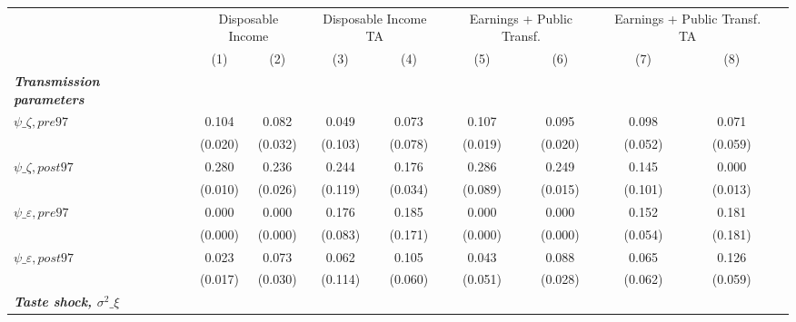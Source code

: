 \begin{tabular}{l*{10}{c}} \toprule
                    &            &\multicolumn{2}{c}{Disposable Income}&\multicolumn{2}{c}{Disposable Income TA}&\multicolumn{2}{c}{Earnings + Public Transf.}&\multicolumn{2}{c}{Earnings + Public Transf. TA}\\\cmidrule{3-4}\cmidrule{5-6}\cmidrule{7-8}\cmidrule{9-10}
                    &            &\multicolumn{1}{c}{(1)}&\multicolumn{1}{c}{(2)}&\multicolumn{1}{c}{(3)}&\multicolumn{1}{c}{(4)}&\multicolumn{1}{c}{(5)}&\multicolumn{1}{c}{(6)}&\multicolumn{1}{c}{(7)}&\multicolumn{1}{c}{(8)}\\
\midrule
\textbf{\emph{Transmission parameters}}&            &            &            &            &            &            &            &            &            \\
\hspace{.3cm} $\psi\_{\zeta,pre97}$&            &       0.104&       0.082&       0.049&       0.073&       0.107&       0.095&       0.098&       0.071\\
                    &            &     (0.020)&     (0.032)&     (0.103)&     (0.078)&     (0.019)&     (0.020)&     (0.052)&     (0.059)\\
\hspace{.3cm} $\psi\_{\zeta,post97}$&            &       0.280&       0.236&       0.244&       0.176&       0.286&       0.249&       0.145&       0.000\\
                    &            &     (0.010)&     (0.026)&     (0.119)&     (0.034)&     (0.089)&     (0.015)&     (0.101)&     (0.013)\\
\hspace{.3cm} $\psi\_{\varepsilon,pre97}$&            &       0.000&       0.000&       0.176&       0.185&       0.000&       0.000&       0.152&       0.181\\
                    &            &     (0.000)&     (0.000)&     (0.083)&     (0.171)&     (0.000)&     (0.000)&     (0.054)&     (0.181)\\
\hspace{.3cm} $\psi\_{\varepsilon,post97}$&            &       0.023&       0.073&       0.062&       0.105&       0.043&       0.088&       0.065&       0.126\\
                    &            &     (0.017)&     (0.030)&     (0.114)&     (0.060)&     (0.051)&     (0.028)&     (0.062)&     (0.059)\\
\textbf{\emph{Taste shock, $\sigma^2\_{\xi}$}}&            &            &            &            &            &            &            &            &            \\

\end{tabular}
